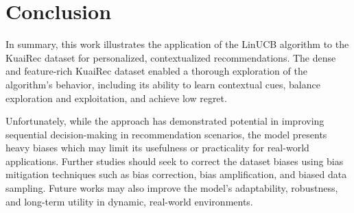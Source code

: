 \section{Conclusion}

In summary, this work illustrates the application of the LinUCB algorithm to the KuaiRec dataset for personalized, contextualized recommendations. The dense and feature-rich KuaiRec dataset enabled a thorough exploration of the algorithm’s behavior, including its ability to learn contextual cues, balance exploration and exploitation, and achieve low regret. 

Unfortunately, while the approach has demonstrated potential in improving sequential decision-making in recommendation scenarios, the model presents heavy biases which may limit its usefulness or practicality for real-world applications. Further studies should seek to correct the dataset biases using bias mitigation techniques such as bias correction, bias amplification, and biased data sampling. Future works may also improve the model's adaptability, robustness, and long-term utility in dynamic, real-world environments.
